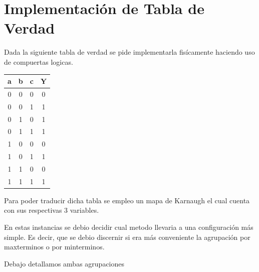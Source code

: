 \chapter{Implementación de Tabla de Verdad}
Dada la siguiente tabla de verdad se pide implementarla fisícamente haciendo uso de compuertas logicas.
\begin{center}
\begin{tabular}{ |c|c|c|c| } 
 \hline
 a & b & c & Y  \\ 
 \hline
 0 & 0 & 0 & 0 \\ 
 \hline
 0 & 0 & 1 & 1 \\ 
 \hline
 0 & 1 & 0 & 1 \\
 \hline
 0 & 1 & 1 & 1 \\
 \hline
 1 & 0 & 0 & 0 \\
 \hline
 1 & 0 & 1 & 1 \\
 \hline
 1 & 1 & 0 & 0 \\
 \hline
 1 & 1 & 1 & 1\\
 \hline 
\end{tabular}
\end{center}
Para poder traducir dicha tabla se empleo un mapa de Karnaugh el cual cuenta con sus respectivas 3 variables.
\begin{center}
 	\begin{Karnaughvuit}
	\end{Karnaughvuit}
\end{center}
En estas instancias se debio decidir cual metodo llevaria a una configuración más simple. Es decir, que se debio discernir si era más conveniente la agrupación por maxterminos o por minterminos.

Debajo detallamos ambas agrupaciones
\begin{center}
 	\begin{Karnaughvuit}
		\minterms{1,3,2,5}
	\end{Karnaughvuit}
\end{center}

